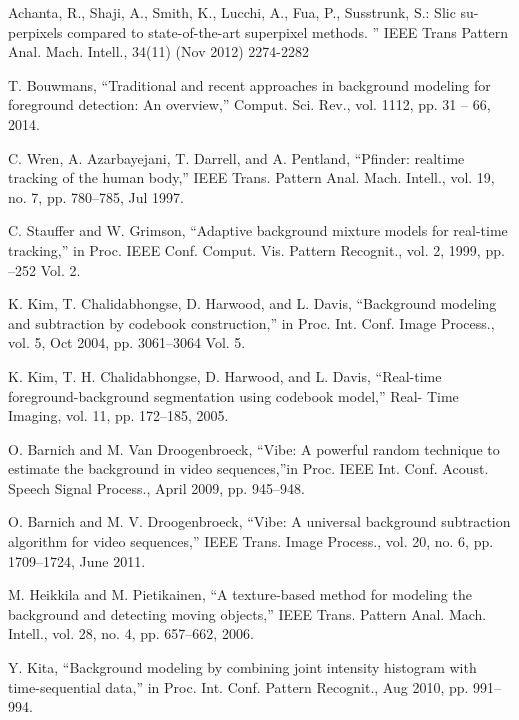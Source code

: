 \documentclass[runningheads,a4paper]{llncs}
\begin{document}
\begin{thebibliography}{4}

 Achanta, R., Shaji, A., Smith, K., Lucchi, A., Fua,
    P., Susstrunk, S.: Slic su- perpixels compared to state-of-the-art
        superpixel methods. ” IEEE Trans Pattern Anal. Mach. Intell., 34(11) (Nov 2012) 2274-2282

 T. Bouwmans, “Traditional and recent approaches in
    background modeling for foreground detection: An overview,” Comput. Sci.
        Rev., vol. 1112, pp. 31 – 66, 2014.

 C. Wren, A. Azarbayejani, T. Darrell, and A.
    Pentland, “Pfinder: realtime tracking of the human body,” IEEE Trans.
        Pattern Anal. Mach. Intell., vol. 19, no. 7, pp. 780–785, Jul 1997.

 C. Stauffer and W. Grimson, “Adaptive background
    mixture models for real-time tracking,” in Proc. IEEE Conf. Comput. Vis.
        Pattern Recognit., vol. 2, 1999, pp. –252 Vol. 2.

 K. Kim, T. Chalidabhongse, D. Harwood, and L.
    Davis, “Background modeling and subtraction by codebook construction,” in
        Proc. Int. Conf. Image Process., vol. 5, Oct 2004, pp. 3061–3064 Vol.
        5.

 K. Kim, T. H. Chalidabhongse, D. Harwood, and L.
    Davis, “Real-time foreground-background segmentation using codebook model,”
        Real- Time Imaging, vol. 11, pp. 172–185, 2005.

 O. Barnich and M. Van Droogenbroeck, “Vibe: A
    powerful random technique to estimate the background in video sequences,”in
        Proc. IEEE Int. Conf. Acoust. Speech Signal Process., April 2009, pp.
        945–948.

 O. Barnich and M. V. Droogenbroeck, “Vibe: A universal
    background subtraction algorithm for video sequences,” IEEE Trans. Image
        Process., vol. 20, no. 6, pp. 1709–1724, June 2011.

 M. Heikkila and M. Pietikainen, “A texture-based
    method for modeling the background and detecting moving objects,” IEEE
        Trans. Pattern Anal. Mach. Intell., vol. 28, no. 4, pp. 657–662, 2006.

 Y. Kita, “Background modeling by combining joint
    intensity histogram with time-sequential data,” in Proc. Int. Conf. Pattern
        Recognit., Aug 2010, pp. 991–994.


\end{thebibliography}
\end{document}
